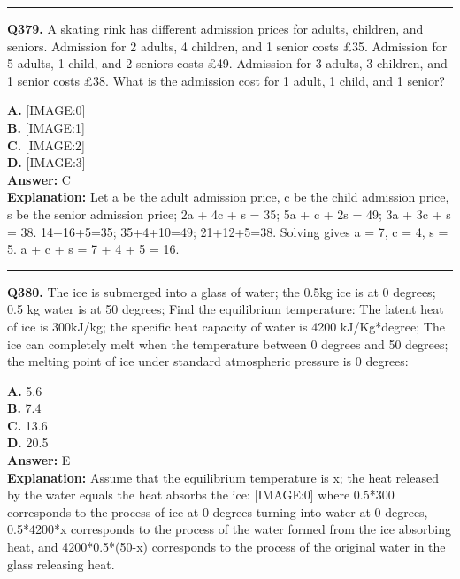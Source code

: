 \documentclass[12pt]{article}
\begin{document}
\hrule
\vspace{1em}


\noindent
\textbf{Q379.} A skating rink has different admission prices for adults, children, and seniors.
Admission for 2 adults, 4 children, and 1 senior costs £35.
Admission for 5 adults, 1 child, and 2 seniors costs £49.
Admission for 3 adults, 3 children, and 1 senior costs £38.
What is the admission cost for 1 adult, 1 child, and 1 senior?



\textbf{A.} [IMAGE:0] \\
\textbf{B.} [IMAGE:1] \\
\textbf{C.} [IMAGE:2] \\
\textbf{D.} [IMAGE:3] \\

\textbf{Answer:} C \\
\textbf{Explanation:} Let a be the adult admission price, c be the child admission price, s be the senior admission price;
2a + 4c + s = 35; 5a + c + 2s = 49; 3a + 3c + s = 38.
14+16+5=35; 35+4+10=49; 21+12+5=38.
Solving gives a = 7, c = 4, s = 5.
a + c + s = 7 + 4 + 5 = 16.

\hrule
\vspace{1em}


\noindent
\textbf{Q380.} The ice is submerged into a glass of water; the 0.5kg ice is at 0 degrees; 0.5 kg water is at 50 degrees; Find the equilibrium temperature: The latent heat of ice is 300kJ/kg; the specific heat capacity of water is 4200 kJ/Kg*degree; The ice can completely melt when the temperature between 0 degrees and 50 degrees; the melting point of ice under standard atmospheric pressure is 0 degrees:



\textbf{A.} 5.6 \\
\textbf{B.} 7.4 \\
\textbf{C.} 13.6 \\
\textbf{D.} 20.5 \\

\textbf{Answer:} E \\
\textbf{Explanation:} Assume that the equilibrium temperature is x; the heat released by the water equals the heat absorbs the ice:
[IMAGE:0]
where 0.5*300
corresponds to the process of ice at 0 degrees turning into water at 0 degrees, 0.5*4200*x
corresponds to the process of the water formed from the ice absorbing heat, and 4200*0.5*(50-x)
corresponds to the process of the original water in the glass releasing heat.
\end{document}
